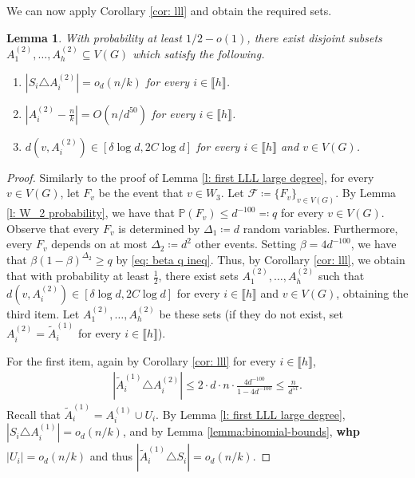 \documentclass[notitlepage]{scrartcl}
\newcommand{\br}[1]{\llbracket{#1}\rrbracket}
\newtheorem{lemma}[thm]{Lemma}
\begin{document}
We can now apply Corollary \ref{cor: lll} and obtain the required sets.
\begin{lemma}\label{l: second lll}
With probability at least $1/2-o(1)$, there exist disjoint subsets $A_1^{(2)},\ldots, A_h^{(2)}\subseteq V(G)$ which satisfy the following.
\begin{enumerate}
    \item $\left|S_i\triangle A_i^{(2)}\right|=o_d(n/k)$ for every $i\in \br{h}$.
    \item $\left|A_i^{(2)}-\frac{n}{k}\right|=O(n/d^{50})$ for every $i\in \br{h}$. 
    \item $d(v, A_i^{(2)})\in \left[\delta \log d, 2C\log d\right]$ for every $i\in \br{h}$ and $v\in V(G)$.
\end{enumerate}
\end{lemma}
\begin{proof}
Similarly to the proof of Lemma \ref{l: first LLL large degree}, for every $v\in V(G)$, let $F_v$ be the event that $v\in W_3$. Let $\mathcal{F}\coloneqq \{F_v\}_{v\in V(G)}$. By Lemma \ref{l: W_2 probability}, we have that $\mathbb{P}\left(F_v\right)\le d^{-100}\eqqcolon q$ for every $v\in V(G)$. Observe that every $F_v$ is determined by $\Delta_1\coloneqq d$ random variables. Furthermore, every $F_v$ depends on at most $\Delta_2\coloneqq d^2$ other events. Setting $\beta = 4 d^{-100}$, we have that $\beta(1-\beta)^{\Delta_2} \ge q$ by \eqref{eq: beta q ineq}. Thus, 
by Corollary \ref{cor: lll}, we obtain that with probability at least $\frac{1}{2}$, there exist sets $A_1^{(2)},\ldots, A_h^{(2)}$ such that $d(v, A_i^{(2)})\in \left[\delta \log d, 2C\log d\right]$ for every $i\in \br{h}$ and $v\in V(G)$, obtaining the third item.  Let $A_1^{(2)},\ldots, A_h^{(2)}$ be these sets (if they do not exist, set $A_i^{(2)}=\tilde{A}_i^{(1)}$ for every $i\in \br{h}$).

For the first item, again by Corollary \ref{cor: lll} for every $i\in \br{h}$, 
\begin{align}
    \left|\tilde{A}_i^{(1)}\triangle A_i^{(2)}\right|\le 2\cdot d\cdot n\cdot \frac{4d^{-100}}{1-4d^{-100}}\le \frac{n}{d^{51}}. \label{eq: A2 vs tilde A}    
\end{align}
Recall that $\tilde{A}_i^{(1)}= A_i^{(1)}\cup U_i$. By Lemma \ref{l: first LLL large degree}, $\left|S_i\triangle A_i^{(1)}\right|=o_d(n/k)$, and by Lemma \ref{lemma:binomial-bounds}, \textbf{whp} $|U_i|=o_d(n/k)$ and thus $|\tilde{A}_i^{(1)}\triangle S_i|=o_d(n/k)$.


\end{proof}
\end{document}
